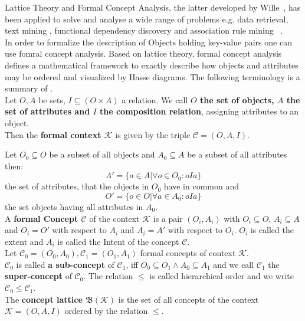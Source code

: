 Lattice Theory and Formal Concept Analysis, the latter developed by Wille~\cite{wille1982restructuring}, has been applied to solve and analyse a wide range of problems e.g. data retrieval, text mining , functional dependency discovery and association rule mining ~\cite{poelmans2012text, soergel1967mathematical, spoerri1993infocrystal, godin1993experimental, godin1993building, carpineto2004exploiting, carpineto2003mining, ganascia1987charade, oosthuizen1988induction, xie2002concept}. \\
In order to formalize the description of Objects holding key-value pairs one can use fomral concept analysis. Based on lattice theory, formal concept analysis defines a mathematical framework to exactly describe how objects and attributes may be ordered and visualized by Hasse diagrams. The following terminology is a summary of \cite{ganter2012formal}. \\

Let $O, A$ be sets, $I \subseteq (O \times A)$ a relation. We call \textbf{$O$ the set of objects, $A$ the set of attributes and $I$ the composition relation}, assigning attributes to an object. \\

Then the \textbf{formal context $\mathcal{K}$} is given by the triple $\mathcal{C} = (O, A, I)$. 

Let $O_0 \subseteq O$ be a subset of all objects and $A_0 \subseteq A$ be a subset of all attributes then:
\[ A' = \{ a \in A | \forall o \in O_0: oIa \}  \]
the set of attributes, that the objects in $O_0$ have in common and 
\[ O' = \{ o \in O | \forall a \in A_0: oIa \} \]
the set objects having all attributes in $A_0$. \\

A \textbf{formal Concept $\mathcal{C}$} of the context $\mathcal{K}$ is a pair $(O_i, A_i)$ with $O_i \subseteq O$,  $A_i \subseteq A$ and $O_i = O'$ with respect to $A_i$ and $A_i = A'$ with respect to $O_i$. $O_i$ is called the extent and $A_i$ is called the Intent of the concept $\mathcal{C}$. \\

Let $\mathcal{C}_0 = (O_0, A_0), \mathcal{C}_1 =(O_1, A_1)$ formal concepts of context $\mathcal{K}$.\\
$\mathcal{C}_0$ is called \textbf{a sub-concept} of $\mathcal{C}_1$, iff $O_0 \subseteq O_1 \wedge A_0 \subseteq A_1$ and we call $\mathcal{C}_1$ the \textbf{super-concept} of $\mathcal{C}_0$. The relation $\leq$ is called hierarchical order and we write $\mathcal{C}_0 \leq \mathcal{C}_1$.  \\
The \textbf{concept lattice $\mathfrak{B}(\mathcal{K})$} is the set of all concepts of the context $\mathcal{K} =(O, A, I)$ ordered by the relation $\leq$. \\

